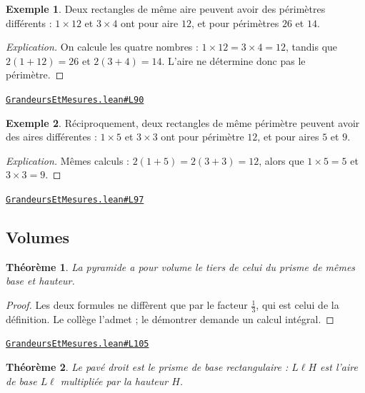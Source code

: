 \documentclass[11pt,a4paper]{article}
\theoremstyle{definition}
\newtheorem{exemple}{Exemple}
\theoremstyle{plain}
\newtheorem{theoreme}{Théorème}
\newenvironment{explication}{\begin{proof}[Explication]}{\end{proof}}
\newcommand{\source}[2]{\par\smallskip\noindent\hfill{\footnotesize\href{#1}{\texttt{#2}}}\par\smallskip}
\begin{document}
\begin{exemple}
Deux rectangles de même aire peuvent avoir des périmètres différents : $1 \times 12$ et
$3 \times 4$ ont pour aire $12$, et pour périmètres $26$ et $14$.
\end{exemple}

\begin{explication}
On calcule les quatre nombres : $1 \times 12 = 3 \times 4 = 12$, tandis que
$2(1 + 12) = 26$ et $2(3 + 4) = 14$. L'aire ne détermine donc pas le périmètre.
\end{explication}
\source{https://github.com/Commutator-IO/learn-lean/blob/main/courses/01-college/04-grandeurs-et-mesures/GrandeursEtMesures.lean\#L90}{GrandeursEtMesures.lean\#L90}

\begin{exemple}
Réciproquement, deux rectangles de même périmètre peuvent avoir des aires différentes :
$1 \times 5$ et $3 \times 3$ ont pour périmètre $12$, et pour aires $5$ et $9$.
\end{exemple}

\begin{explication}
Mêmes calculs : $2(1+5) = 2(3+3) = 12$, alors que $1 \times 5 = 5$ et $3 \times 3 = 9$.
\end{explication}
\source{https://github.com/Commutator-IO/learn-lean/blob/main/courses/01-college/04-grandeurs-et-mesures/GrandeursEtMesures.lean\#L97}{GrandeursEtMesures.lean\#L97}

\subsection{Volumes}

\begin{theoreme}
La pyramide a pour volume le tiers de celui du prisme de mêmes base et hauteur.
\end{theoreme}

\begin{proof}
Les deux formules ne diffèrent que par le facteur $\tfrac13$, qui est celui de la
définition. Le collège l'admet ; le démontrer demande un calcul intégral.
\end{proof}
\source{https://github.com/Commutator-IO/learn-lean/blob/main/courses/01-college/04-grandeurs-et-mesures/GrandeursEtMesures.lean\#L105}{GrandeursEtMesures.lean\#L105}

\begin{theoreme}
Le pavé droit est le prisme de base rectangulaire : $L\ell H$ est l'aire de base
$L\ell$ multipliée par la hauteur $H$.
\end{theoreme}
\end{document}

